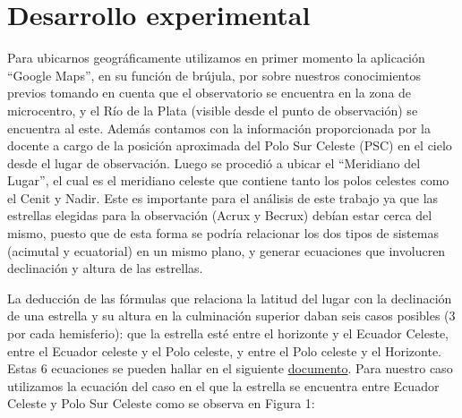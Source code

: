\documentclass[12pt, a4paper]{article} %
\begin{document}
\section{Desarrollo experimental}
Para ubicarnos geográficamente utilizamos en primer momento la aplicación “Google Maps”, en su función de brújula, por sobre nuestros conocimientos previos tomando en cuenta que el observatorio se encuentra en la zona de microcentro, y el Río de la Plata (visible desde el punto de observación) se encuentra al este. Además contamos con la información proporcionada por la docente a cargo de la posición aproximada del Polo Sur Celeste (PSC) en el cielo desde el lugar de observación. Luego se procedió a ubicar el “Meridiano del Lugar”, el cual es el meridiano celeste que contiene tanto los polos celestes como el Cenit y Nadir. Este es importante para el análisis de este trabajo ya que las estrellas elegidas para la observación (Acrux y Becrux) debían estar cerca del mismo, puesto que de esta forma se podría relacionar los dos tipos de sistemas (acimutal y ecuatorial) en un mismo plano, y generar ecuaciones que involucren declinación y altura de las estrellas. 

La deducción de las fórmulas que relaciona la latitud del lugar con la declinación de una estrella y su altura en la culminación superior daban seis casos posibles (3 por cada hemisferio): que la estrella esté entre el horizonte y el Ecuador Celeste, entre el Ecuador celeste y el Polo celeste, y entre el Polo celeste y el Horizonte. Estas 6 ecuaciones se pueden hallar en el siguiente \href{https://drive.google.com/file/d/1PSPDWVVv-hCkP-eURhVxcOJhzzR4_x4P/view}{documento}. 
Para nuestro caso utilizamos la ecuación del caso en el que la estrella se encuentra entre Ecuador Celeste y Polo Sur Celeste como se observa en Figura 1:
\end{document}
